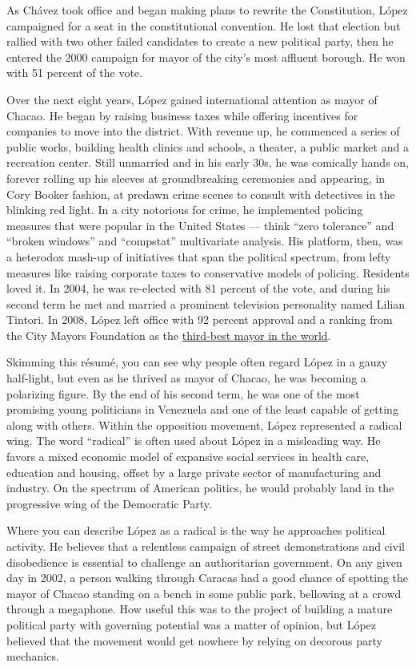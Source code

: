 As Chávez took office and began making plans to rewrite the
Constitution, López campaigned for a seat in the constitutional
convention. He lost that election but rallied with two other failed
candidates to create a new political party, then he entered the 2000
campaign for mayor of the city's most affluent borough. He won with 51
percent of the vote.

Over the next eight years, López gained international attention as mayor
of Chacao. He began by raising business taxes while offering incentives
for companies to move into the district. With revenue up, he commenced a
series of public works, building health clinics and schools, a theater,
a public market and a recreation center. Still unmarried and in his
early 30s, he was comically hands on, forever rolling up his sleeves at
groundbreaking ceremonies and appearing, in Cory Booker fashion, at
predawn crime scenes to consult with detectives in the blinking red
light. In a city notorious for crime, he implemented policing measures
that were popular in the United States --- think ``zero tolerance'' and
``broken windows'' and ``compstat'' multivariate analysis. His platform,
then, was a heterodox mash-up of initiatives that span the political
spectrum, from lefty measures like raising corporate taxes to
conservative models of policing. Residents loved it. In 2004, he was
re-elected with 81 percent of the vote, and during his second term he
met and married a prominent television personality named Lilian Tintori.
In 2008, López left office with 92 percent approval and a ranking from
the City Mayors Foundation as the
\href{http://www.worldmayor.com/contest_2008/world-mayor-2008-results.html}{third-best
mayor in the world}.

Skimming this résumé, you can see why people often regard López in a
gauzy half-light, but even as he thrived as mayor of Chacao, he was
becoming a polarizing figure. By the end of his second term, he was one
of the most promising young politicians in Venezuela and one of the
least capable of getting along with others. Within the opposition
movement, López represented a radical wing. The word ``radical'' is
often used about López in a misleading way. He favors a mixed economic
model of expansive social services in health care, education and
housing, offset by a large private sector of manufacturing and industry.
On the spectrum of American politics, he would probably land in the
progressive wing of the Democratic Party.

Where you can describe López as a radical is the way he approaches
political activity. He believes that a relentless campaign of street
demonstrations and civil disobedience is essential to challenge an
authoritarian government. On any given day in 2002, a person walking
through Caracas had a good chance of spotting the mayor of Chacao
standing on a bench in some public park, bellowing at a crowd through a
megaphone. How useful this was to the project of building a mature
political party with governing potential was a matter of opinion, but
López believed that the movement would get nowhere by relying on
decorous party mechanics.

